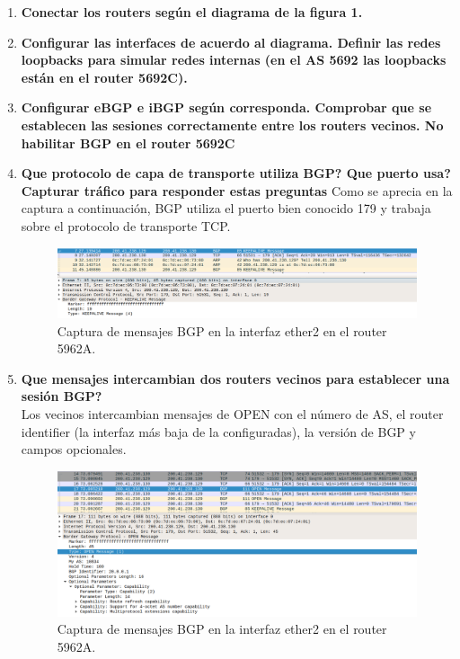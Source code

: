 \documentclass[letterpaper,12pt]{article}
\begin{document}
	\begin{enumerate}
		\item \textbf{Conectar los routers según el diagrama de la figura 1.}
		\item \textbf{Configurar las interfaces de acuerdo al diagrama. Definir las redes loopbacks para simular redes internas (en el AS 5692 las loopbacks están en el router 5692C).}
		\item \textbf{Configurar eBGP e iBGP según corresponda. Comprobar que se establecen las sesiones correctamente entre los routers vecinos. No habilitar BGP en el router 5692C}
		
		\item \textbf{Que protocolo de capa de transporte utiliza BGP? Que puerto usa? Capturar tráfico para responder estas preguntas}
		Como se aprecia en la captura a continuación, BGP utiliza el puerto bien conocido 179 y trabaja sobre el protocolo de transporte TCP.

		\begin{figure}[H]
			\centering \includegraphics[width=1\columnwidth]{figure/bgp-transport.png}
			\caption{
				\label{fig:samplesetup} %
				Captura de mensajes BGP en la interfaz ether2 en el router 5962A.
			}
		\end{figure}
		
		\item \textbf{Que mensajes intercambian dos routers vecinos para establecer una sesión BGP?}\\
		Los vecinos intercambian mensajes de OPEN con el número de AS, el router identifier (la interfaz más baja de la configuradas), la versión de BGP y campos opcionales.

		\begin{figure}[H]
			\centering \includegraphics[width=1\columnwidth]{figure/bgp-open.png}
			\caption{
				\label{fig:samplesetup} %
				Captura de mensajes BGP en la interfaz ether2 en el router 5962A.
			}
		\end{figure}


\end{enumerate}
\end{document}
